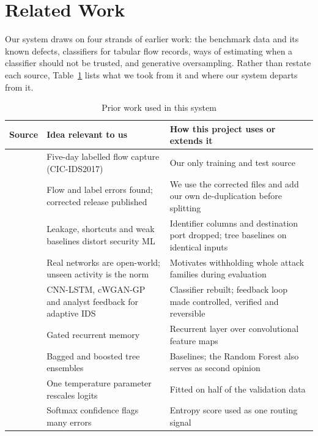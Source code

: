 \documentclass[conference]{IEEEtran}
\begin{document}
\section{Related Work}
Our system draws on four strands of earlier work: the benchmark data and its known defects,
classifiers for tabular flow records, ways of estimating when a classifier should not be
trusted, and generative oversampling. Rather than restate each source, Table~\ref{tab:related}
lists what we took from it and where our system departs from it.

\begin{table}[t]
\caption{Prior work used in this system}
\label{tab:related}
\centering
\footnotesize
\begin{tabular}{p{2.6cm}p{6.2cm}p{7.6cm}}
\toprule
Source & Idea relevant to us & How this project uses or extends it \\
\midrule
\cite{sharafaldin2018toward} & Five-day labelled flow capture (CIC-IDS2017) & Our only training and test source \\
\cite{engelen2021troubleshooting,liu2022error} & Flow and label errors found; corrected release published & We use the corrected files and add our own de-duplication before splitting \\
\cite{arp2022dos} & Leakage, shortcuts and weak baselines distort security ML & Identifier columns and destination port dropped; tree baselines on identical inputs \\
\cite{sommer2010outside} & Real networks are open-world; unseen activity is the norm & Motivates withholding whole attack families during evaluation \\
\cite{refpaper2025} & CNN-LSTM, cWGAN-GP and analyst feedback for adaptive IDS & Classifier rebuilt; feedback loop made controlled, verified and reversible \\
\cite{hochreiter1997lstm} & Gated recurrent memory & Recurrent layer over convolutional feature maps \\
\cite{breiman2001random,ke2017lightgbm} & Bagged and boosted tree ensembles & Baselines; the Random Forest also serves as second opinion \\
\cite{guo2017calibration} & One temperature parameter rescales logits & Fitted on half of the validation data \\
\cite{hendrycks2017baseline} & Softmax confidence flags many errors & Entropy score used as one routing signal \\

\end{tabular}
\end{table}
\end{document}
